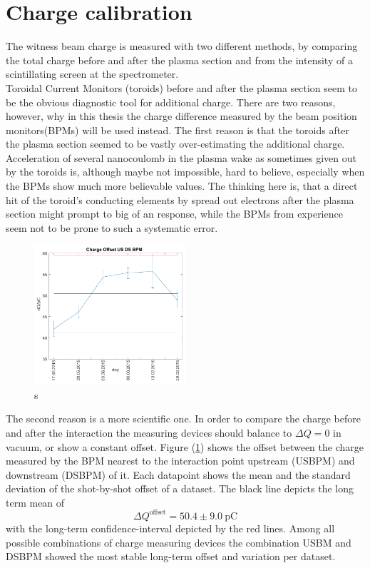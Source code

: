 \section{Charge calibration}
The witness beam charge is measured with two different methods, by comparing the total charge before and after the plasma section and from the intensity of a scintillating screen at the spectrometer.\\
Toroidal Current Monitors (toroids) before and after the plasma section seem to be the obvious diagnostic tool for additional charge. 
There are two reasons, however, why in this thesis the charge difference measured by the beam position monitors(BPMs) will be used instead. 
The first reason is that the toroids after the plasma section seemed to be vastly over-estimating the additional charge. Acceleration of several nanocoulomb in the plasma wake as sometimes given out by the toroids is, although maybe not impossible, hard to believe, especially when the BPMs show much more believable values. The thinking here is, that 
a direct hit of the toroid's conducting elements by spread out electrons after the plasma section might prompt to big of an response, while the BPMs from experience seem not to be prone to such a systematic error. 
\begin{figure}[htbp]
\center
\includegraphics[width=0.5\textwidth]{experiment/images/edited/Charge_Tara.pdf}
\caption{s}
\label{img:Q_offset}
\end{figure}
The second reason is a more scientific one. 
In order to compare the charge before and after the interaction the measuring devices should balance to $\Delta Q =0$ in vacuum, or show a constant offset. Figure (\ref{img:Q_offset}) shows the offset between the charge measured by the  BPM nearest to the interaction point upstream (USBPM) and downstream (DSBPM) of it. Each datapoint shows the mean and the standard deviation of the shot-by-shot offset of a dataset. The black line depicts the long term mean of 
\begin{equation}
\Delta Q^\mathrm{offset}=50.4\pm 9.0\ \mathrm{pC}
\end{equation}
 with the long-term confidence-interval depicted by the red lines. Among all possible combinations of charge measuring devices the combination USBM and DSBPM showed the most stable long-term offset and variation per dataset.


